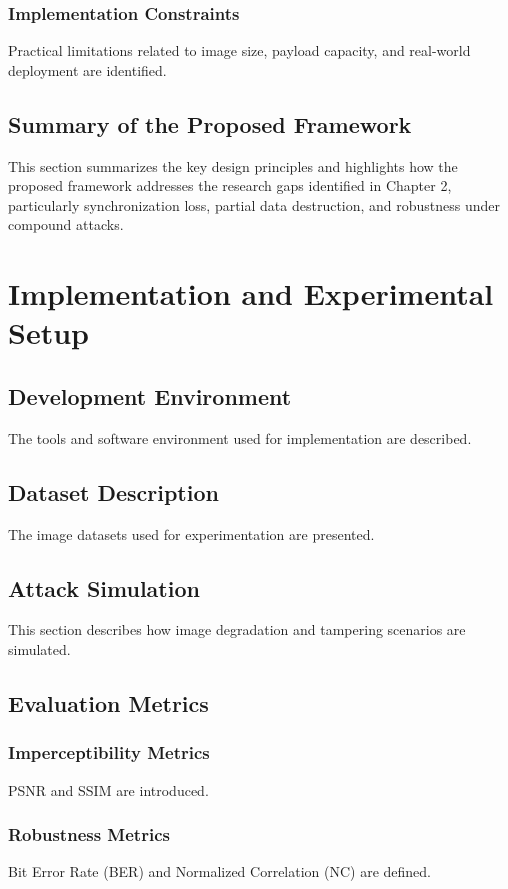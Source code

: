 \documentclass[12pt,a4paper,oneside]{report}
\begin{document}
	\subsection{Implementation Constraints}
	Practical limitations related to image size, payload capacity, and real-world deployment are identified.
	
	\section{Summary of the Proposed Framework}
	This section summarizes the key design principles and highlights how the proposed framework addresses the research gaps identified in Chapter 2, particularly synchronization loss, partial data destruction, and robustness under compound attacks.
	
	
	
	\chapter{Implementation and Experimental Setup}
	\section{Development Environment}
	The tools and software environment used for implementation are described.
	
	\section{Dataset Description}
	The image datasets used for experimentation are presented.
	
	\section{Attack Simulation}
	This section describes how image degradation and tampering scenarios are simulated.
	
	\section{Evaluation Metrics}
	\subsection{Imperceptibility Metrics}
	PSNR and SSIM are introduced.
	
	\subsection{Robustness Metrics}
	Bit Error Rate (BER) and Normalized Correlation (NC) are defined.
	
\end{document}
